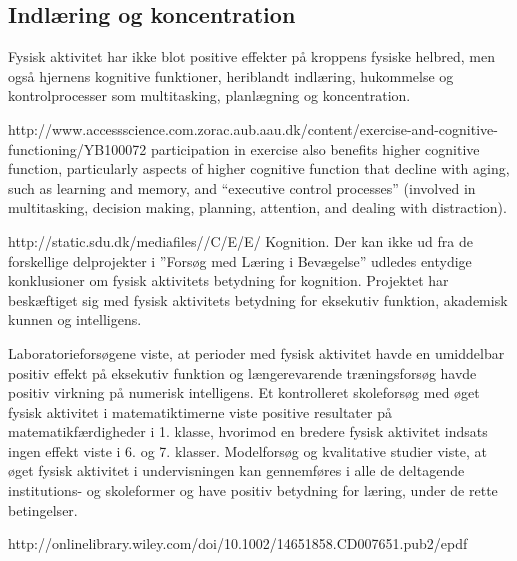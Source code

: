 \subsection{Indlæring og koncentration}


Fysisk aktivitet har ikke blot positive effekter på kroppens fysiske helbred, men også hjernens kognitive funktioner, heriblandt indlæring, hukommelse og kontrolprocesser som multitasking, planlægning og koncentration\cite{Berchtold2010}.



http://www.accessscience.com.zorac.aub.aau.dk/content/exercise-and-cognitive-functioning/YB100072
participation in exercise also benefits higher cognitive function, particularly aspects of higher cognitive function that decline with aging, such as learning and memory, and “executive control processes” (involved in multitasking, decision making, planning, attention, and dealing with distraction).

http://static.sdu.dk/mediafiles//C/E/E/%
Kognition. Der kan ikke ud fra de forskellige delprojekter i ”Forsøg med Læring i Bevægelse” udledes entydige konklusioner om fysisk aktivitets betydning for kognition. Projektet har beskæftiget sig med fysisk aktivitets betydning for eksekutiv funktion, akademisk kunnen og intelligens. 

Laboratorieforsøgene viste, at perioder med fysisk aktivitet havde en umiddelbar positiv effekt på eksekutiv funktion og længerevarende træningsforsøg havde positiv virkning på numerisk intelligens. Et kontrolleret skoleforsøg med øget fysisk aktivitet i matematiktimerne viste positive resultater på matematikfærdigheder i 1. klasse, hvorimod en bredere fysisk aktivitet indsats ingen effekt viste i 6. og 7. klasser. Modelforsøg og kvalitative studier viste, at øget fysisk aktivitet i undervisningen kan gennemføres i alle de deltagende institutions- og skoleformer og have positiv betydning for læring, under de rette betingelser.

http://onlinelibrary.wiley.com/doi/10.1002/14651858.CD007651.pub2/epdf
